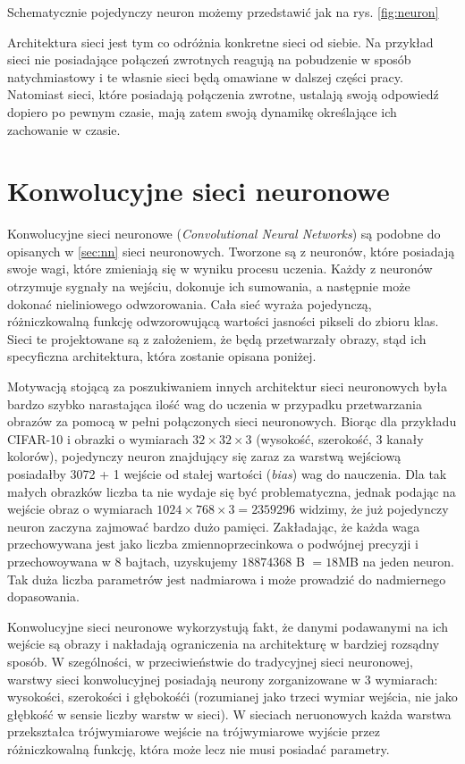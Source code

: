 Schematycznie pojedynczy neuron możemy przedstawić jak na rys. \ref{fig:neuron}

Architektura sieci jest tym co odróżnia konkretne sieci od siebie.
Na przykład sieci nie posiadające połączeń zwrotnych reagują na pobudzenie w sposób natychmiastowy i te własnie sieci będą omawiane w dalszej części pracy.
Natomiast sieci, które posiadają połączenia zwrotne, ustalają swoją odpowiedź dopiero po pewnym czasie, mają zatem swoją dynamikę określające ich zachowanie w czasie. \cite{zuradabarskijedruch1996}



\section{Konwolucyjne sieci neuronowe}\label{sec:cnn}

Konwolucyjne sieci neuronowe (\textit{Convolutional Neural Networks}) są podobne do opisanych w \ref{sec:nn} sieci neuronowych.
Tworzone są z neuronów, które posiadają swoje wagi, które zmieniają się w wyniku procesu uczenia.
Każdy z neuronów otrzymuje sygnały na wejściu, dokonuje ich sumowania, a następnie może dokonać nieliniowego odwzorowania.
Cała sieć wyraża pojedynczą, różniczkowalną funkcję odwzorowującą wartości jasności pikseli do zbioru klas.
Sieci te projektowane są z założeniem, że będą przetwarzały obrazy, stąd ich specyficzna architektura, która zostanie opisana poniżej.

Motywacją stojącą za poszukiwaniem innych architektur sieci neuronowych była bardzo szybko narastająca ilość wag do uczenia w przypadku przetwarzania obrazów za pomocą w pełni połączonych sieci neuronowych.
Biorąc dla przykładu CIFAR-10 i obrazki o wymiarach $ 32 \times 32 \times 3$ (wysokość, szerokość, 3 kanały kolorów), pojedynczy neuron znajdujący się zaraz za warstwą wejściową posiadałby 3072 + 1 wejście od stałej wartości (\textit{bias}) wag do nauczenia.
Dla tak małych obrazków liczba ta nie wydaje się być problematyczna, jednak podając na wejście obraz o wymiarach $1024 \times 768 \times 3 = 2359296$ widzimy, że już pojedynczy neuron zaczyna zajmować bardzo dużo pamięci.
Zakładając, że każda waga przechowywana jest jako liczba zmiennoprzecinkowa o podwójnej precyzji i przechowoywana w 8 bajtach, uzyskujemy $18874368$ B $= 18$MB na jeden neuron.
Tak duża liczba parametrów jest nadmiarowa i może prowadzić do nadmiernego dopasowania.

Konwolucyjne sieci neuronowe wykorzystują fakt, że danymi podawanymi na ich wejście są obrazy i nakładają ograniczenia na architekturę w bardziej rozsądny sposób.
W szególności, w przeciwieństwie do tradycyjnej sieci neuronowej, warstwy sieci konwolucyjnej posiadają neurony zorganizowane w 3 wymiarach: wysokości, szerokości i głębokośći (rozumianej jako trzeci wymiar wejścia, nie jako głębkość w sensie liczby warstw w sieci).
W sieciach neruonowych każda warstwa przekształca trójwymiarowe wejście na trójwymiarowe wyjście przez różniczkowalną funkcję, która może lecz nie musi posiadać parametry.

